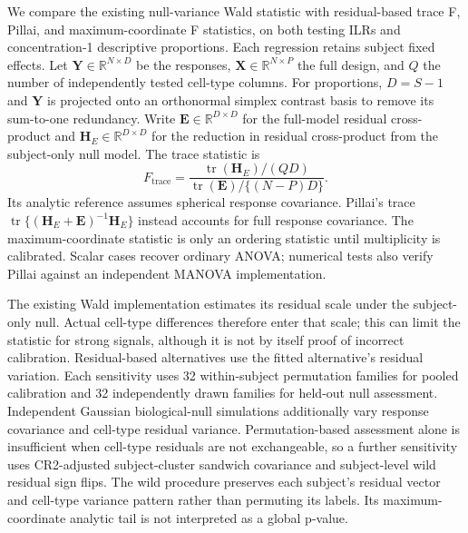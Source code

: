 \documentclass[11pt]{article}
\begin{document}
We compare the existing null-variance Wald statistic with residual-based trace F, Pillai, and maximum-coordinate F statistics, on both testing ILRs and concentration-1 descriptive proportions. Each regression retains subject fixed effects. Let \(\mathbf Y\in\mathbb R^{N\times D}\) be the responses, \(\mathbf X\in\mathbb R^{N\times P}\) the full design, and \(Q\) the number of independently tested cell-type columns. For proportions, \(D=S-1\) and \(\mathbf Y\) is projected onto an orthonormal simplex contrast basis to remove its sum-to-one redundancy. Write \(\mathbf E\in\mathbb R^{D\times D}\) for the full-model residual cross-product and \(\mathbf H_E\in\mathbb R^{D\times D}\) for the reduction in residual cross-product from the subject-only null model. The trace statistic is \begin{equation}F_{\mathrm{trace}}=\frac{\operatorname{tr}(\mathbf H_E)/(QD)}{\operatorname{tr}(\mathbf E)/\{(N-P)D\}}.\end{equation} Its analytic reference assumes spherical response covariance. Pillai's trace \(\operatorname{tr}\{(\mathbf H_E+\mathbf E)^{-1}\mathbf H_E\}\) instead accounts for full response covariance. The maximum-coordinate statistic is only an ordering statistic until multiplicity is calibrated. Scalar cases recover ordinary ANOVA; numerical tests also verify Pillai against an independent MANOVA implementation.

The existing Wald implementation estimates its residual scale under the subject-only null. Actual cell-type differences therefore enter that scale; this can limit the statistic for strong signals, although it is not by itself proof of incorrect calibration. Residual-based alternatives use the fitted alternative's residual variation. Each sensitivity uses 32 within-subject permutation families for pooled calibration and 32 independently drawn families for held-out null assessment. Independent Gaussian biological-null simulations additionally vary response covariance and cell-type residual variance. Permutation-based assessment alone is insufficient when cell-type residuals are not exchangeable, so a further sensitivity uses CR2-adjusted subject-cluster sandwich covariance and subject-level wild residual sign flips. The wild procedure preserves each subject's residual vector and cell-type variance pattern rather than permuting its labels. Its maximum-coordinate analytic tail is not interpreted as a global p-value.
\end{document}
